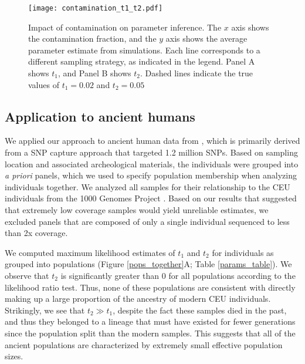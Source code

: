 \documentclass[11pt, oneside]{article}   	%
\begin{document}
\begin{figure}[!h] %
   \centering
   \texttt{[image: contamination\_t1\_t2.pdf]} 
   \caption{Impact of contamination on parameter inference. The $x$ axis shows the contamination fraction, and the $y$ axis shows the average parameter estimate from simulations. Each line corresponds to a different sampling strategy, as indicated in the legend. Panel A shows $t_1$, and Panel B shows $t_2$. Dashed lines indicate the true values of $t_1 = 0.02$ and $t_2 = 0.05$}
   \label{contamination}
\end{figure}


\subsection{Application to ancient humans}
We applied our approach to ancient human data from \citet{mathieson2015genome}, which is primarily derived from a SNP capture approach that targeted 1.2 million SNPs. Based on sampling location and associated archeological materials, the individuals were grouped into \emph{a priori} panels, which we used to specify population membership when analyzing individuals together. We analyzed all samples for their relationship to the CEU individuals from the 1000 Genomes Project \citep{10002015global}. Based on our results that suggested that extremely low coverage samples would yield unreliable estimates, we excluded panels that are composed of only a single individual sequenced to less than 2x coverage.

We computed maximum likelihood estimates of $t_1$ and $t_2$ for individuals as grouped into populations (Figure \ref{pops_together}A; Table \ref{params_table}). We observe that $t_2$ is significantly greater than 0 for all populations according to the likelihood ratio test. Thus, none of these populations are consistent with directly making up a large proportion of the ancestry of modern CEU individuals. Strikingly, we see that $t_2 \gg t_1$, despite the fact these samples died in the past, and thus they belonged to a lineage that must have existed for fewer generations since the population split than the modern samples. This suggests that all of the ancient populations are characterized by extremely small effective population sizes.
\end{document}
